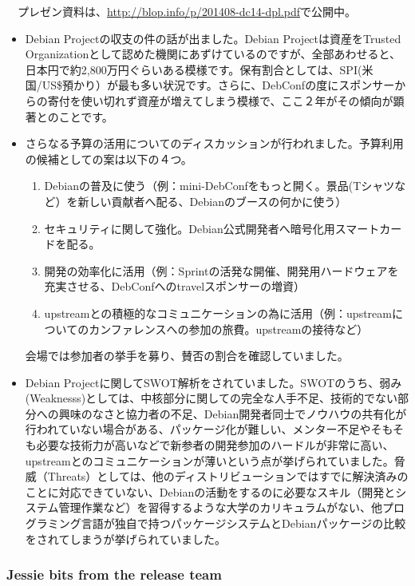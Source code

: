 \documentclass[mingoth,a4paper]{jsarticle}
\begin{document}
　プレゼン資料は、\url{http://blop.info/p/201408-dc14-dpl.pdf}で公開中。

 \begin{itemize}
 \item Debian Projectの収支の件の話が出ました。Debian Projectは資産をTrusted Organizationとして認めた機関にあずけているのですが、全部あわせると、日本円で約2,800万円ぐらいある模様です。保有割合としては、SPI(米国/US\$預かり）が最も多い状況です。さらに、DebConfの度にスポンサーからの寄付を使い切れず資産が増えてしまう模様で、ここ２年がその傾向が顕著とのことです。
 \item さらなる予算の活用についてのディスカッションが行われました。予算利用の候補としての案は以下の４つ。
   \begin{enumerate}
      \item Debianの普及に使う（例：mini-DebConfをもっと開く。景品(Tシャツなど）を新しい貢献者へ配る、Debianのブースの何かに使う）
      \item セキュリティに関して強化。Debian公式開発者へ暗号化用スマートカードを配る。
      \item 開発の効率化に活用（例：Sprintの活発な開催、開発用ハードウェアを充実させる、DebConfへのtravelスポンサーの増資）
      \item upstreamとの積極的なコミュニケーションの為に活用（例：upstreamについてのカンファレンスへの参加の旅費。upstreamの接待など）
   \end{enumerate}
   会場では参加者の挙手を募り、賛否の割合を確認していました。
 \end{itemize}

 \begin{itemize}
 \item Debian Projectに関してSWOT解析をされていました。SWOTのうち、弱み(Weaknesss)としては、中核部分に関しての完全な人手不足、技術的でない部分への興味のなさと協力者の不足、Debian開発者同士でノウハウの共有化が行われていない場合がある、パッケージ化が難しい、メンター不足やそもそも必要な技術力が高いなどで新参者の開発参加のハードルが非常に高い、upstreamとのコミュニケーションが薄いという点が挙げられていました。脅威（Threats）としては、他のディストリビューションではすでに解決済みのことに対応できていない、Debianの活動をするのに必要なスキル（開発とシステム管理作業など）を習得するような大学のカリキュラムがない、他プログラミング言語が独自で持つパッケージシステムとDebianパッケージの比較をされてしまうが挙げられていました。
\end{itemize}

\subsubsection{Jessie bits from the release team}
\end{document}
